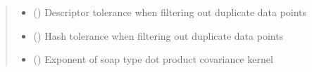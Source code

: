 \documentclass[letterpaper,10pt,english]{sphinxmanual}
\begin{document}
\begin{fulllineitems}
\begin{quote}
\begin{description}
\begin{itemize}
\item {} 
 () \textendash{} Descriptor tolerance when filtering out duplicate data points

\item {} 
 () \textendash{} Hash tolerance when filtering out duplicate data points

\item {} 
 () \textendash{} Exponent of soap type dot product covariance kernel

\end{itemize}

\end{description}\end{quote}

\end{fulllineitems}


\begin{fulllineitems}
\label{\detokenize{descriptors:gap.descriptors.MissingParameter}}
\end{fulllineitems}

\end{document}
